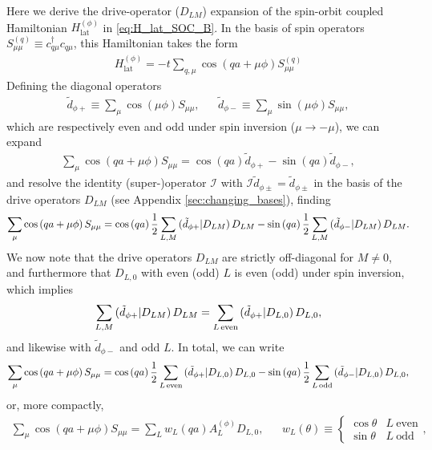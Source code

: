 \documentclass[nofootinbib,notitlepage,11pt]{revtex4-2}
\renewcommand{\t}{\text} %
\newcommand{\f}[2]{\dfrac{#1}{#2}} %
\newcommand{\p}[1]{\left(#1\right)} %
\newcommand{\1}{\mathds{1}}
\newcommand{\I}{\mathcal{I}}
\def\obk#1{\mathinner{({#1})}}
\begin{document}
Here we derive the drive-operator ($D_{LM}$) expansion of the
spin-orbit coupled Hamiltonian $H_{\t{lat}}^{(\phi)}$ in
\eqref{eq:H_lat_SOC_B}.  In the basis of spin operators
$S_{\mu\mu}^{(q)} \equiv c_{q\mu}^\dag c_{q\mu}$, this Hamiltonian
takes the form
\begin{align}
  H_{\t{lat}}^{(\phi)}
  = -t \sum_{q,\mu} \cos\p{qa+\mu\phi} S_{\mu\mu}^{(q)}
  \label{eq:H_lat_spin}
\end{align}
Defining the diagonal operators
\begin{align}
  \tilde d_{\phi+} \equiv \sum_\mu \cos\p{\mu\phi} S_{\mu\mu},
  &&
  \tilde d_{\phi-} \equiv \sum_\mu \sin\p{\mu\phi} S_{\mu\mu},
\end{align}
which are respectively even and odd under spin inversion
($\mu\to-\mu$), we can expand
\begin{align}
  \sum_\mu \cos\p{qa+\mu\phi} S_{\mu\mu}
  = \cos\p{qa} \tilde d_{\phi+} - \sin\p{qa} \tilde d_{\phi-},
\end{align}
and resolve the identity (super-)operator $\I$ with
$\I \tilde d_{\phi\pm} = \tilde d_{\phi\pm}$ in the basis of the drive operators
$D_{LM}$ (see Appendix \ref{sec:changing_bases}), finding
\begin{align}
  \sum_\mu \cos\p{qa+\mu\phi} S_{\mu\mu}
  = \cos\p{qa} \f12 \sum_{L,M} \obk{\tilde d_{\phi+}|D_{LM}} D_{LM}
  - \sin\p{qa} \f12 \sum_{L,M} \obk{\tilde d_{\phi-}|D_{LM}} D_{LM}.
\end{align}
We now note that the drive operators $D_{LM}$ are strictly
off-diagonal for $M\ne0$, and furthermore that $D_{L,0}$ with even
(odd) $L$ is even (odd) under spin inversion, which implies
\begin{align}
  \sum_{L,M} \obk{\tilde d_{\phi+}|D_{LM}} D_{LM}
  = \sum_{L\,\t{even}} \obk{\tilde d_{\phi+}|D_{L,0}} D_{L,0},
\end{align}
and likewise with $\tilde d_{\phi-}$ and odd $L$.  In total, we can
write
\begin{align}
  \sum_\mu \cos\p{qa+\mu\phi} S_{\mu\mu}
  = \cos\p{qa} \f12 \sum_{L\,\t{even}}
  \obk{\tilde d_{\phi+}|D_{L,0}} D_{L,0}
  - \sin\p{qa} \f12 \sum_{L\,\t{odd}}
  \obk{\tilde d_{\phi-}|D_{L,0}} D_{L,0},
\end{align}
or, more compactly,
\begin{align}
  \sum_\mu \cos\p{qa+\mu\phi} S_{\mu\mu}
  = \sum_L w_L\p{qa} A_L^{(\phi)} D_{L,0},
  &&
  w_L\p{\theta} \equiv
  \begin{cases}
    \cos\theta & L~\t{even} \\
    \sin\theta & L~\t{odd}
  \end{cases},
  \label{eq:compact_SOC_drive}
\end{align}
\end{document}
